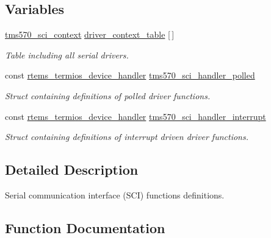 \subsection*{Variables}
\begin{DoxyCompactItemize}
\item 
\mbox{\hyperlink{structtms570__sci__context}{tms570\+\_\+sci\+\_\+context}} \mbox{\hyperlink{tms570-sci_8c_a6162f56b8d4e448ce7f72275b7bdc039}{driver\+\_\+context\+\_\+table}} \mbox{[}$\,$\mbox{]}
\begin{DoxyCompactList}\small\item\em Table including all serial drivers. \end{DoxyCompactList}\item 
const \mbox{\hyperlink{structrtems__termios__device__handler}{rtems\+\_\+termios\+\_\+device\+\_\+handler}} \mbox{\hyperlink{tms570-sci_8c_a2f9036d4d7c7c5dcb9068422928da97a}{tms570\+\_\+sci\+\_\+handler\+\_\+polled}}
\begin{DoxyCompactList}\small\item\em Struct containing definitions of polled driver functions. \end{DoxyCompactList}\item 
const \mbox{\hyperlink{structrtems__termios__device__handler}{rtems\+\_\+termios\+\_\+device\+\_\+handler}} \mbox{\hyperlink{tms570-sci_8c_afc72c833e5a0309b5716223987446713}{tms570\+\_\+sci\+\_\+handler\+\_\+interrupt}}
\begin{DoxyCompactList}\small\item\em Struct containing definitions of interrupt driven driver functions. \end{DoxyCompactList}\end{DoxyCompactItemize}


\subsection{Detailed Description}
Serial communication interface (S\+CI) functions definitions. 



\subsection{Function Documentation}
\mbox{\label{tms570-sci_8c_aafa42e88bcc94ce0f507f77be54a90a6}} 
